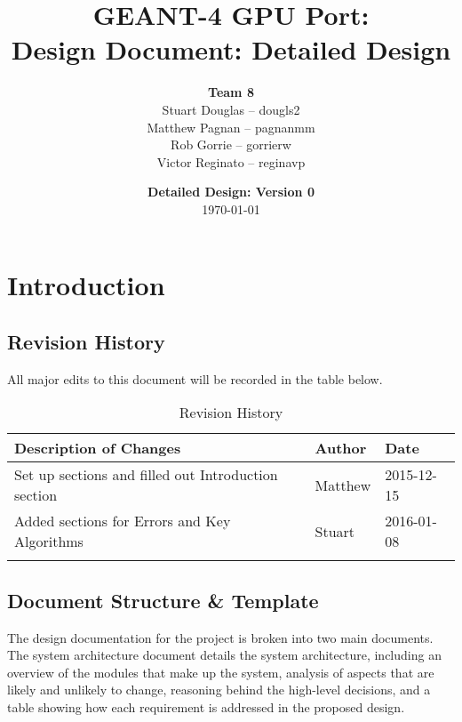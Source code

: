 \documentclass[12pt]{article}
\title{
\LARGE GEANT-4 GPU Port:
\\\vspace{10mm}
\large \textbf{Design Document: Detailed Design}
\vspace{40mm}
}
\author{
\textbf{Team 8}
\\Stuart Douglas -- dougls2
\\Matthew Pagnan -- pagnanmm
\\Rob Gorrie -- gorrierw
\\Victor Reginato -- reginavp
\vspace{10mm}
}
\date{\vfill \textbf{Detailed Design: Version 0}\\ \today}
\begin{document}

\maketitle
\newpage

\renewcommand{\contentsname}{Table of Contents}
\tableofcontents
\newpage
{}

\section{Introduction}
\subsection{Revision History}
All major edits to this document will be recorded in the table below.

\begin{table}[h]
\centering
\caption{Revision History}\label{Table_Revision}
\begin{tabular}{lll}

\toprule
\bf Description of Changes & \bf Author & \bf Date\\\midrule
\arrayrulecolor{lightgray}
Set up sections and filled out Introduction section & Matthew & 2015-12-15\\\hline
Added sections for Errors and Key Algorithms & Stuart & 2016-01-08\\
\arrayrulecolor{black}
\bottomrule
\end{tabular}
\end{table}

\subsection{Document Structure \& Template}
The design documentation for the project is broken into two main documents.\\

The system architecture document details the system architecture, including an overview of the modules that make up the system, analysis of aspects that are likely and unlikely to change, reasoning behind the high-level decisions, and a table showing how each requirement is addressed in the proposed design.\\
\end{document}
